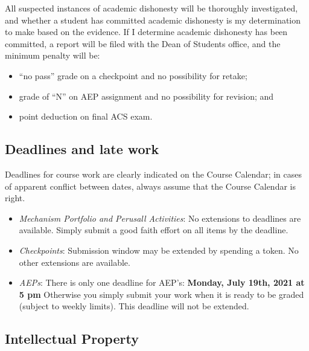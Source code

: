 All suspected instances of academic dishonesty will be thoroughly
investigated, and whether a student has committed academic dishonesty is
my determination to make based on the evidence. If I determine academic
dishonesty has been committed, a report will be filed with the Dean of
Students office, and the minimum penalty will be:

\begin{itemize}
\tightlist
\item
  ``no pass'' grade on a checkpoint and no possibility for retake;
\item
  grade of ``N'' on AEP assignment and no possibility for revision; and
\item
  point deduction on final ACS exam.
\end{itemize}

\hypertarget{deadlines-and-late-work}{%
\subsection{Deadlines and late work}\label{deadlines-and-late-work}}

Deadlines for course work are clearly indicated on the Course Calendar;
in cases of apparent conflict between dates, always assume that the
Course Calendar is right.

\begin{itemize}
\tightlist
\item
  \emph{Mechanism Portfolio and Perusall Activities}: No extensions to
  deadlines are available. Simply submit a good faith effort on all
  items by the deadline.
\item
  \emph{Checkpoints}: Submission window may be extended by spending a
  token. No other extensions are available.
\item
  \emph{AEPs}: There is only one deadline for AEP's: \textbf{Monday,
  July 19th, 2021 at 5 pm} Otherwise you simply submit your work when it
  is ready to be graded (subject to weekly limits). This deadline will
  not be extended.
\end{itemize}

\hypertarget{intellectual-property}{%
\subsection{Intellectual Property}\label{intellectual-property}}

